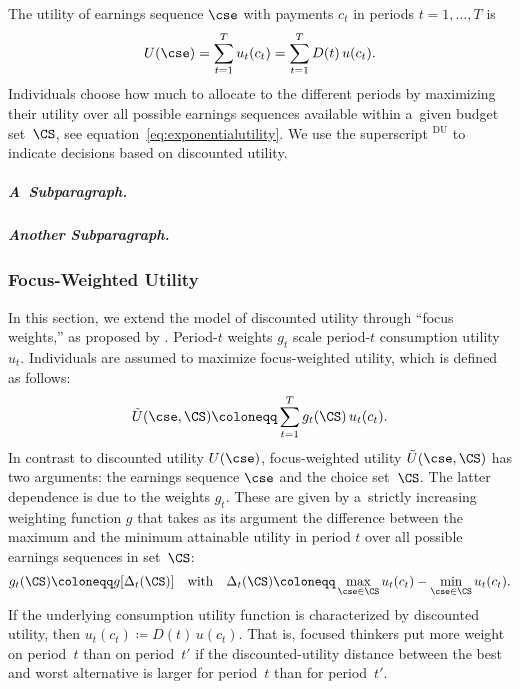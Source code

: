 The utility of earnings sequence $\cse$ with payments $c_t$ in periods $t = 1, \dots, T$ is
\begin{equation}
	\label{eq:exponentialutility}
	U(\cse) = \sum_{t=1}^{T} u_t(c_t) = \sum_{t=1}^{T} D(t)\,u(c_t).
\end{equation}
Individuals choose how much to allocate to the different periods by maximizing their utility over all possible earnings sequences available within a~given budget set~$\CS$, see equation~\eqref{eq:exponentialutility}. We use the superscript $^\mathrm{DU}$ to indicate decisions based on discounted utility.

\subparagraph{A~Subparagraph.}
\Blindtext[2]

\subparagraph{Another Subparagraph.}
\blindtext

\displaybaselinegrid

\subsubsection{Focus-Weighted Utility}
In this section, we extend the model of discounted utility through ``focus weights,'' as proposed by \cite{Koszegi2013}. Period-$t$ weights $g_{t}$ scale period-$t$ consumption utility $u_t$. Individuals are assumed to maximize focus-weighted utility, which is defined as follows:
\begin{equation} \label{eq:focusutility}
	\tilde{U}(\cse, \CS) \coloneqq \sum_{t=1}^{T} g_t(\CS)\,u_t(c_t).
\end{equation}
In contrast to discounted utility $U(\cse)$, focus-weighted utility $\tilde{U}(\cse, \CS)$ has two arguments: the earnings sequence $\cse$ and the choice set~$\CS$. The latter dependence is due to the weights $g_t$. These are given by a~strictly increasing weighting function $g$ that takes as its argument the difference between the maximum and the minimum attainable utility in period $t$ over all possible earnings sequences in set~$\CS$:
\begin{equation} \label{eq:focusweight}
	g_t(\CS) \coloneqq g[\Delta_t(\CS)] \quad
	\text{with} \quad \Delta_t(\CS)
	\coloneqq
	\max\limits_{\cse \in \CS} u_t(c_t) - \min\limits_{\cse \in \CS} u_t(c_t).
\end{equation}
If the underlying consumption utility function is characterized by discounted utility, then ${u_t(c_t) \coloneqq D(t)\,u(c_t)}$.
That is, focused thinkers put more weight on period~$t$ than on period~$t'$ if the discounted-utility distance between the best and worst alternative is larger for period~$t$ than for period~$t'$.

